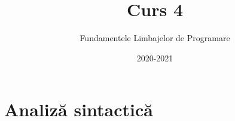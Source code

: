\documentclass[xcolor=x11names,compress,10pt]{beamer}
\begin{document}
\title{\\Curs 4}
\author{Fundamentele Limbajelor de Programare} 
\date{2020-2021} 

\frame{\titlepage} 


%
%
%
%




\section{Analiză sintactică}\sectionframe
\end{document}

